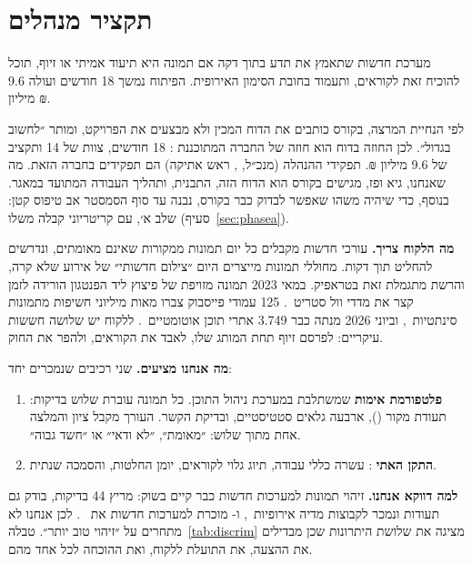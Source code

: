 \chapter{תקציר מנהלים}\label{ch:exec}

\begin{keybox}
מערכת חדשות שתאמץ את  תדע בתוך דקה אם תמונה היא תיעוד אמיתי או זיוף, תוכל להוכיח זאת לקוראים, ותעמוד בחובת הסימון האירופית. הפיתוח נמשך \num{18} חודשים ועולה \num{9.6} מיליון ₪.
\end{keybox}

\begin{notebox}
לפי הנחיית המרצה, בקורס כותבים את הדוח המכין ולא מבצעים את הפרויקט, ומותר ״לחשוב בגדול״. לכן החוזה בדוח הוא חוזה של החברה המתוכננת : \num{18} חודשים, צוות של \num{14} ותקציב של \num{9.6} מיליון ₪. תפקידי ההנהלה (מנכ״ל, , ראש אתיקה) הם תפקידים בחברה הזאת. מה שאנחנו, גיא ופז, מגישים בקורס הוא הדוח הזה, התבנית, ותהליך העבודה המתועד במאגר.
 בנוסף, כדי שיהיה משהו שאפשר לבדוק כבר בקורס, נבנה עד סוף הסמסטר אב טיפוס קטן: שלב א׳, עם קריטריוני קבלה משלו (סעיף~\ref{sec:phasea}).
\end{notebox}

\textbf{מה הלקוח צריך.} עורכי חדשות מקבלים כל יום תמונות ממקורות שאינם מאומתים, ונדרשים להחליט תוך דקות. מחוללי תמונות מייצרים היום ״צילום חדשותי״ של אירוע שלא קרה, והרשת מתגמלת זאת בטראפיק. במאי \num{2023} תמונה מזויפת של פיצוץ ליד הפנטגון הורידה לזמן קצר את מדדי וול סטריט~\cite{npr2023}. \num{125} עמודי פייסבוק צברו מאות מיליוני חשיפות מתמונות סינתטיות~\cite{diresta2024}, וביוני \num{2026} מנתה  כבר \num{3,749} אתרי תוכן אוטומטיים~\cite{newsguard2026}. ללקוח יש שלושה חששות עיקריים: לפרסם זיוף תחת המותג שלו, לאבד את הקוראים, ולהפר את החוק.

\textbf{מה אנחנו מציעים.} שני רכיבים שנמכרים יחד:
\begin{enumerate}
\item \textbf{פלטפורמת אימות} שמשתלבת במערכת ניהול התוכן. כל תמונה עוברת שלוש בדיקות: תעודת מקור (), ארבעה גלאים סטטיסטיים, ובדיקת הקשר. העורך מקבל ציון והמלצה אחת מתוך שלוש: ״מאומת״, ״לא ודאי״ או ״חשד גבוה״.
\item \textbf{התקן האתי }: עשרה כללי עבודה, תיוג גלוי לקוראים, יומן החלטות, והסמכה שנתית.
\end{enumerate}

\textbf{למה דווקא אנחנו.} זיהוי תמונות למערכות חדשות כבר קיים בשוק:  מריץ \num{44} בדיקות, בודק גם תעודות  ונמכר לקבוצות מדיה אירופיות~\cite{imagewhisperer,iwhome}, ו- מוכרת למערכות חדשות את ~\cite{apverify}. לכן אנחנו לא מתחרים על ״זיהוי טוב יותר״. טבלה~\ref{tab:discrim} מציגה את שלושת היתרונות שכן מבדילים את ההצעה, את התועלת ללקוח, ואת ההוכחה לכל אחד מהם.

